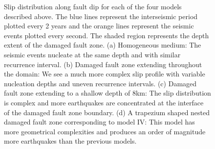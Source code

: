 \documentclass[11pt]{article}
\begin{document}
\begin{figure}[!htb]
{    }
    \caption{Slip distribution along fault dip for each of the four models described above. The blue lines represent the interseismic period plotted every 2 years and the orange lines represent the seismic events plotted every second. The shaded region represents the depth extent of the damaged fault zone. (a) Homogeneous medium: The seismic events nucleate at the same depth and with similar recurrence interval. (b) Damaged fault zone extending throughout the domain: We see a much more complex slip profile with variable nucleation depths and uneven recurrence intervals. (c)  Damaged fault zone extending to a shallow depth of 8km: The slip distribution is complex and more earthquakes are concentrated at the interface of the damaged fault zone boundary. (d) A trapezium shaped nested damaged fault zone corresponding to model IV:  This model has more geometrical complexities and produces an order of magnitude more earthquakes than the previous models.}
\end{figure}
\end{document}
